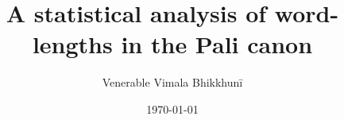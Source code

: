 \clearpage
\thispagestyle{empty}
\titlehead{DRAFT}
\title{A statistical analysis of word-lengths in the Pali canon}
\subtitle{}
\author{Venerable Vimala Bhikkhunī}
\date{\today}
\maketitle
